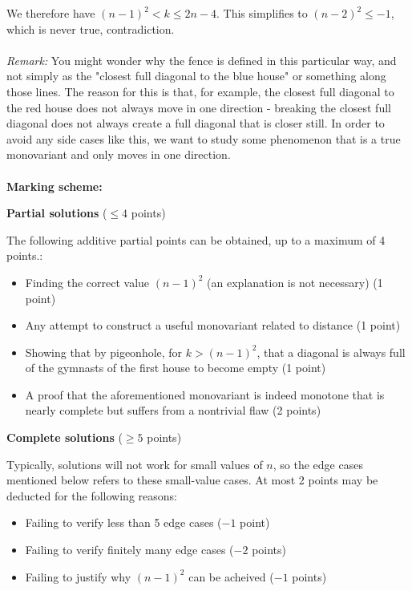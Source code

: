 {We therefore have $(n-1)^2 < k \le 2n-4$. This simplifies to $(n-2)^2 \le -1$, which is never true, contradiction.\\
\bigskip
\\
\emph{Remark:} You might wonder why the fence is defined in this particular way, and not simply as the "closest full diagonal to the blue house" or something along those lines. The reason for this is that, for example, the closest full diagonal to the red house does not always move in one direction - breaking the closest full diagonal does not always create a full diagonal that is closer still. In order to avoid any side cases like this, we want to study some phenomenon that is a true monovariant and only moves in one direction.  \\
\bigskip
\\
\textbf{Marking scheme:}

\textbf{Partial solutions} \dotfill ($\leq 4$ points)

The following additive partial points can be obtained, up to a maximum of 4 points.:
\begin{itemize}
\item Finding the correct value $(n-1)^2$ (an explanation is not necessary) \dotfill (1 point)
\item Any attempt to construct a useful monovariant related to distance \dotfill (1 point)
\item Showing that by pigeonhole, for $k > (n-1)^2$, that a diagonal is always full of the gymnasts of the first house to become empty \dotfill (1 point) 
\item A proof that the aforementioned monovariant is indeed monotone that is nearly complete but suffers from a nontrivial flaw \dotfill (2 points)
\end{itemize}

\textbf{Complete solutions} \dotfill ($\geq 5$ points) 

Typically, solutions will not work for small values of $n$, so the edge cases mentioned below refers to these small-value cases. At most 2 points may be deducted for the following reasons:
\begin{itemize}
\item Failing to verify less than 5 edge cases \dotfill ($-1$ point)
\item Failing to verify finitely many edge cases \dotfill ($-2$ points)
\item Failing to justify why $(n-1)^2$ can be acheived \dotfill ($-1$ points)
\end{itemize}
}
